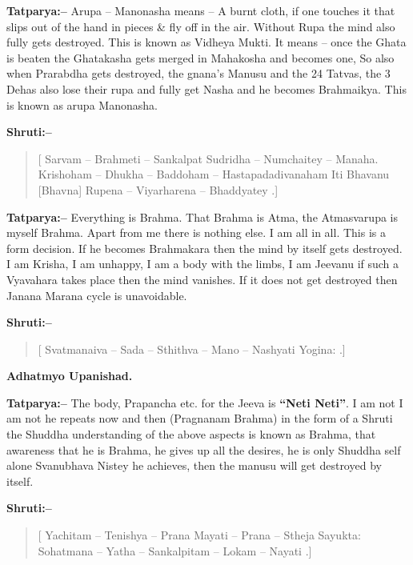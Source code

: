 \textbf{Tatparya:–} Arupa – Manonasha means – A burnt cloth, if one touches it that slips out of the hand in pieces \& fly off in the air. Without Rupa the mind also fully gets destroyed. This is known as Vidheya Mukti. It means – once the Ghata is beaten the Ghatakasha gets merged in Mahakosha and becomes one, So also when Prarabdha gets destroyed, the gnana's Manusu and the 24 Tatvas, the 3 Dehas also lose their rupa and fully get Nasha and he becomes Brahmaikya. This is known as arupa Manonasha.

\textbf{Shruti:–}

\begin{verse}
[ Sarvam – Brahmeti – Sankalpat Sudridha – Numchaitey – Manaha.  Krishoham – Dhukha – Baddoham – Hastapadadivanaham  Iti Bhavanu [Bhavna] Rupena – Viyarharena – Bhaddyatey .]
\end{verse}

\textbf{Tatparya:–} Everything is Brahma. That Brahma is Atma, the Atmasvarupa is myself Brahma. Apart from me there is nothing else. I am all in all. This is a form decision. If he becomes Brahmakara then the mind by itself gets destroyed. I am Krisha, I am unhappy, I am a body with the limbs, I am Jeevanu if such a Vyavahara takes place then the mind vanishes. If it does not get destroyed then Janana Marana cycle is unavoidable.

\textbf{Shruti:–}

\begin{verse}
[ Svatmanaiva – Sada – Sthithva – Mano – Nashyati Yogina: .]
\end{verse}

\begin{flushright}
\textbf{Adhatmyo Upanishad.}
\end{flushright}

\textbf{Tatparya:–} The body, Prapancha etc. for the Jeeva is \textbf{“Neti Neti”}. I am not I am not he repeats now and then (Pragnanam Brahma) in the form of a Shruti the Shuddha understanding of the above aspects is known as Brahma, that awareness that he is Brahma, he gives up all the desires, he is only Shuddha self alone Svanubhava Nistey he achieves, then the manusu will get destroyed by itself.

\textbf{Shruti:–}

\begin{verse}
[ Yachitam – Tenishya – Prana Mayati – Prana – Stheja Sayukta:  Sohatmana – Yatha – Sankalpitam – Lokam – Nayati .]
\end{verse}

